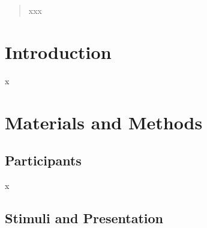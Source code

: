 
\author{Author 1        \and
        Author 2   \and
        Author 3    \and
        Author 4    \and
        Author 5    %
}



\date{Received: date / Accepted: date}


\maketitle

\begin{abstract}
xxx

\end{abstract}

\section{Introduction}
\label{introduction}
x

\section{Materials and Methods}
\label{methods}

\subsection{Participants}

x

\subsection{Stimuli and Presentation}

